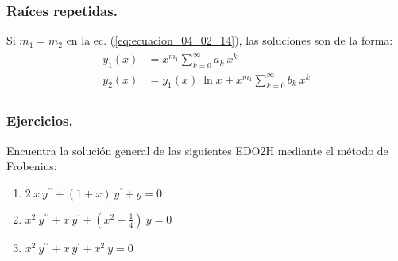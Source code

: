 \subsubsection{Raíces repetidas.}
Si $m_{1} = m_{2}$ en la ec. (\ref{eq:ecuacion_04_02_14}), las soluciones son de la forma:
\begin{align}
\begin{aligned}
y_{1}(x) &= x^{m_{1}} \sum_{k=0}^{\infty} a_{k} \: x^{k} \\
y_{2}(x) &= y_{1}(x) \: \ln x + x^{m_{1}} \sum_{k=0}^{\infty} b_{k} \: x^{k}
\end{aligned}
\label{eq:ecuacion_04_02_76}
\end{align}
\subsubsection{Ejercicios.}
Encuentra la solución general de las siguientes EDO2H mediante el método de Frobenius:
\begin{enumerate}
\item $2 \: x \: y^{\prime \prime} + (1 + x) \: y^{\prime} + y = 0 $
\item $x^{2} \: y^{\prime \prime} + x \: y^{\prime} + (x^{2} - \frac{1}{4}) \: y = 0 $
\item $x^{2} \: y^{\prime \prime} + x \: y^{\prime} + x^{2} \: y = 0$
\end{enumerate}
